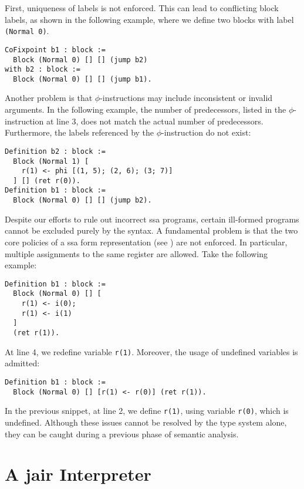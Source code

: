 First, uniqueness of labels is not enforced. This can lead to conflicting block labels, as shown in the following example, where we define two blocks with label \texttt{(Normal 0)}.

\begin{lstlisting}[style=Rocq]
CoFixpoint b1 : block :=
  Block (Normal 0) [] [] (jump b2)
with b2 : block :=
  Block (Normal 0) [] [] (jump b1).
\end{lstlisting}

Another problem is that $\phi$-instructions may include inconsistent or invalid arguments. In the following example, the number of predecessors, listed in the $\phi$-instruction at line 3, does not match the actual number of predecessors. Furthermore, the labels referenced by the $\phi$-instruction do not exist:

\begin{lstlisting}[style=Rocq]
Definition b2 : block :=
  Block (Normal 1) [
    r(1) <- phi [(1, 5); (2, 6); (3; 7)]
  ] [] (ret r(0)).
Definition b1 : block :=
  Block (Normal 0) [] [] (jump b2).
\end{lstlisting}

Despite our efforts to rule out incorrect \gls{ssa} programs, certain ill-formed programs cannot be excluded purely by the syntax.
A fundamental problem is that the two core policies of a \gls{ssa} form representation (see ) are not enforced. In particular, multiple assignments to the same register are allowed. Take the following example:

\begin{lstlisting}[style=Rocq]
Definition b1 : block :=
  Block (Normal 0) [] [
    r(1) <- i(0);
    r(1) <- i(1)
  ]
  (ret r(1)).
\end{lstlisting}

At line 4, we redefine variable \texttt{r(1)}.
Moreover, the usage of undefined variables is admitted:

\begin{lstlisting}[style=Rocq]
Definition b1 : block :=
  Block (Normal 0) [] [r(1) <- r(0)] (ret r(1)).
\end{lstlisting}

In the previous snippet, at line 2, we define \texttt{r(1)}, using variable \texttt{r(0)}, which is undefined.
Although these issues cannot be resolved by the type system alone, they can be caught during a previous phase of semantic analysis.

\section{A \gls{jair} Interpreter}
\label{sec:jair-vm}

